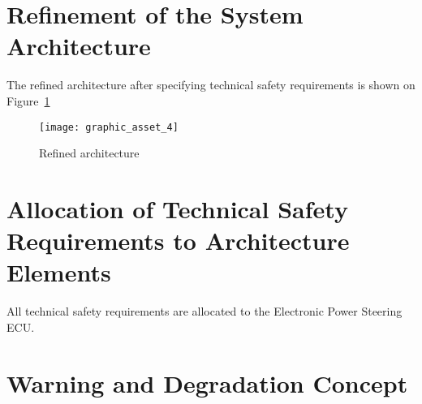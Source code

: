 


\section{Refinement of the System Architecture}

The refined architecture after specifying technical safety 
requirements is shown on Figure~\ref{fig:ref-arch-tech}

\begin{figure}[!htbp]
\texttt{[image: graphic\_asset\_4]}
\caption{Refined architecture}
\label{fig:ref-arch-tech}
\end{figure}


\section{Allocation of Technical Safety Requirements to Architecture Elements}

All technical safety requirements are allocated to the Electronic Power Steering ECU.


\section{Warning and Degradation Concept}


